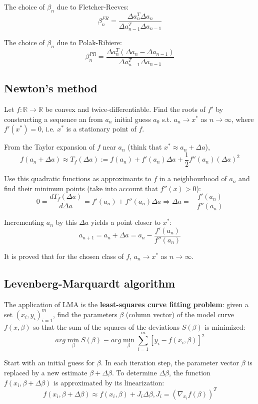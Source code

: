 \documentclass[a4paper,article,14pt]{extarticle}
\begin{document}
	The choice of $\beta_n$ due to Fletcher-Reeves: $$\beta_n^{FR} = \frac{\Delta a_n^T \Delta a_n}{\Delta a_{n-1}^T \Delta a_{n-1}}$$
	
	The choice of $\beta_n$ due to Polak-Ribiere: $$\beta_n^{PR} = \frac{\Delta a_n^T (\Delta a_n - \Delta a_{n-1})}{\Delta a_{n-1}^T \Delta a_{n-1}}$$
	
	\subsection{Newton’s method}
	
	Let $f:\mathbb{R} \rightarrow \mathbb{R}$ be convex and twice-differentiable. Find the roots of $f'$ by constructing a sequence an from $a_n$ initial guess $a_0$ s.t. $a_n \rightarrow x^*$ as $n \rightarrow \infty$, where $f'(x^*) = 0$, i.e. $x^*$ is a stationary point of $f$.
	
	From the Taylor expansion of $f$ near $a_n$ (think that $x^* \approx a_n + \Delta a$), $$f(a_n + \Delta a) \approx T_f (\Delta a) := f(a_n) + f'(a_n)\Delta a +\frac{1}{2} f''(a_n)(\Delta a)^2$$
	
	Use this quadratic functions as approximants to $f$ in a neighbourhood of $a_n$ and find their minimum points (take into account that $f''(x) > 0$): $$0=\frac{dT_f (\Delta a)}{d \Delta a} = f'(a_n) + f''(a_n)\Delta a \Rightarrow \Delta a = - \frac{f'(a_n)}{f''(a_n)}$$
	
	Incrementing $a_n$ by this $\Delta a$ yields a point closer to $x^*$: $$a_{n+1}=a_n + \Delta a=a_n - \frac{f'(a_n)}{f''(a_n)}$$
	
	It is proved that for the chosen class of $f$, $a_n \rightarrow x^*$ as $n \rightarrow \infty$.
	
	\subsection{Levenberg-Marquardt algorithm}
	The application of LMA is the \textbf{least-squares curve fitting problem}: given a set $(x_i, y_i)_{i=1}^m$, find the parameters $\beta$ (column vector) of the model curve $f(x,\beta)$ so that the sum of the squares of the deviations $S(\beta)$ is minimized: $$arg\min_{\beta} S(\beta)\equiv arg\min_{\beta} \sum_{i=1}^{m}[y_i - f(x_i,\beta)]^2$$
	
	Start with an initial guess for $\beta$. In each iteration step, the parameter vector $\beta$ is replaced by a new estimate $\beta + \Delta \beta$. To determine $\Delta \beta$, the function $f(x_i,\beta + \Delta \beta)$ is approximated by its linearization: $$f(x_i, \beta + \Delta \beta) \approx f(x_i, \beta) + J_i \Delta\beta, J_i = (\nabla_{x_i}f(\beta))^T$$
	
\end{document}
